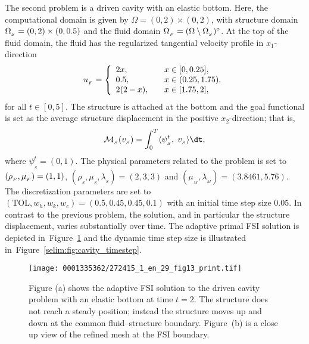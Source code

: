 The second problem is a driven cavity with an elastic bottom. Here,
the computational domain is given by $\Omega = (0,2)\times (0,2)$,
with structure domain $\Omega_{_{S}} = (0, 2)\times (0, 0.5)$ and the fluid
domain $\Omega_{_{F}} = (\Omega\setminus \Omega_{_{S}})^{\circ}$. At the top of the fluid
domain, the fluid has the regularized tangential velocity profile in
$x_1$-direction
\begin{equation}
u_{_{F}} =
\left\{
\begin{array}{lcl}
2x,& &x\in[0, 0.25],\\
0.5,& &x\in(0.25 ,1.75),\\
2(2-x),&  &x\in[1.75, 2],
\end{array}
\right.
\end{equation}
for all $t \in [0,5]$. The structure is attached at the bottom and the
goal functional is set as the average structure displacement in the positive
$x_2$-direction; that is,
\begin{equation}
\label{selim:eq:goalfunctional_cavity}
\M_{_{S}}(v_{_{S}}) = \int_0^T \langle \psi^t_{_{S}},\; v_{_{S}}\rangle \dt,
\end{equation}
where $\psi^t_{_{S}}=(0,1)$.  The physical parameters related to the
problem is set to $(\rho_{_{F}},\mu_{_{F}}) = (1, 1)$,
$(\rho_{_{S}},\mu_{_{S}}, \lambda_{_{S}}) = (2, 3, 3)$ and
$(\mu_{_{M}}, \lambda_{_{M}}) = (3.8461, 5.76)$. The discretization
parameters are set to\break $(\mathrm{TOL}, w_h, w_k,w_c) = (0.5, 0.45,
0.45, 0.1)$ with an initial time step size $0.05$.  In contrast to the
previous problem, the solution, and in particular the structure
displacement, varies substantially over time. The adaptive primal FSI
solution is depicted in~Figure~\ref{selim:fig:primal_cavity} and the
dynamic time step size is illustrated
in~Figure~\ref{selim:fig:cavity_timestep}.

\begin{figure}[!t]
\centering
\texttt{[image: 0001335362/272415\_1\_en\_29\_fig13\_print.tif]}
  \caption{Figure (a) shows the adaptive FSI solution to the driven
    cavity problem with an elastic bottom at time $t=2$. The structure
    does not reach a steady position; instead the structure moves up and
    down at the common fluid--structure boundary. Figure~(b) is a close
    up view of the refined mesh at the FSI boundary.}
\label{selim:fig:primal_cavity}\vspace*{9pt}
\end{figure}

